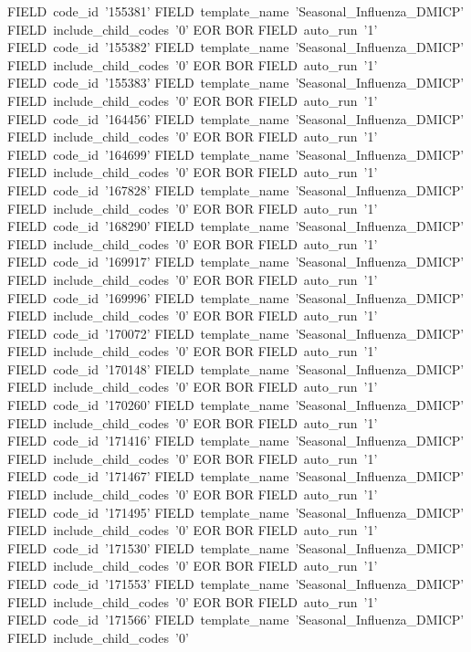     FIELD~code_id~'155381'
    FIELD~template_name~'Seasonal_Influenza_DMICP'
    FIELD~include_child_codes~'0'
  EOR
  BOR
    FIELD~auto_run~'1'
    FIELD~code_id~'155382'
    FIELD~template_name~'Seasonal_Influenza_DMICP'
    FIELD~include_child_codes~'0'
  EOR
  BOR
    FIELD~auto_run~'1'
    FIELD~code_id~'155383'
    FIELD~template_name~'Seasonal_Influenza_DMICP'
    FIELD~include_child_codes~'0'
  EOR
  BOR
    FIELD~auto_run~'1'
    FIELD~code_id~'164456'
    FIELD~template_name~'Seasonal_Influenza_DMICP'
    FIELD~include_child_codes~'0'
  EOR
  BOR
    FIELD~auto_run~'1'
    FIELD~code_id~'164699'
    FIELD~template_name~'Seasonal_Influenza_DMICP'
    FIELD~include_child_codes~'0'
  EOR
  BOR
    FIELD~auto_run~'1'
    FIELD~code_id~'167828'
    FIELD~template_name~'Seasonal_Influenza_DMICP'
    FIELD~include_child_codes~'0'
  EOR
  BOR
    FIELD~auto_run~'1'
    FIELD~code_id~'168290'
    FIELD~template_name~'Seasonal_Influenza_DMICP'
    FIELD~include_child_codes~'0'
  EOR
  BOR
    FIELD~auto_run~'1'
    FIELD~code_id~'169917'
    FIELD~template_name~'Seasonal_Influenza_DMICP'
    FIELD~include_child_codes~'0'
  EOR
  BOR
    FIELD~auto_run~'1'
    FIELD~code_id~'169996'
    FIELD~template_name~'Seasonal_Influenza_DMICP'
    FIELD~include_child_codes~'0'
  EOR
  BOR
    FIELD~auto_run~'1'
    FIELD~code_id~'170072'
    FIELD~template_name~'Seasonal_Influenza_DMICP'
    FIELD~include_child_codes~'0'
  EOR
  BOR
    FIELD~auto_run~'1'
    FIELD~code_id~'170148'
    FIELD~template_name~'Seasonal_Influenza_DMICP'
    FIELD~include_child_codes~'0'
  EOR
  BOR
    FIELD~auto_run~'1'
    FIELD~code_id~'170260'
    FIELD~template_name~'Seasonal_Influenza_DMICP'
    FIELD~include_child_codes~'0'
  EOR
  BOR
    FIELD~auto_run~'1'
    FIELD~code_id~'171416'
    FIELD~template_name~'Seasonal_Influenza_DMICP'
    FIELD~include_child_codes~'0'
  EOR
  BOR
    FIELD~auto_run~'1'
    FIELD~code_id~'171467'
    FIELD~template_name~'Seasonal_Influenza_DMICP'
    FIELD~include_child_codes~'0'
  EOR
  BOR
    FIELD~auto_run~'1'
    FIELD~code_id~'171495'
    FIELD~template_name~'Seasonal_Influenza_DMICP'
    FIELD~include_child_codes~'0'
  EOR
  BOR
    FIELD~auto_run~'1'
    FIELD~code_id~'171530'
    FIELD~template_name~'Seasonal_Influenza_DMICP'
    FIELD~include_child_codes~'0'
  EOR
  BOR
    FIELD~auto_run~'1'
    FIELD~code_id~'171553'
    FIELD~template_name~'Seasonal_Influenza_DMICP'
    FIELD~include_child_codes~'0'
  EOR
  BOR
    FIELD~auto_run~'1'
    FIELD~code_id~'171566'
    FIELD~template_name~'Seasonal_Influenza_DMICP'
    FIELD~include_child_codes~'0'
